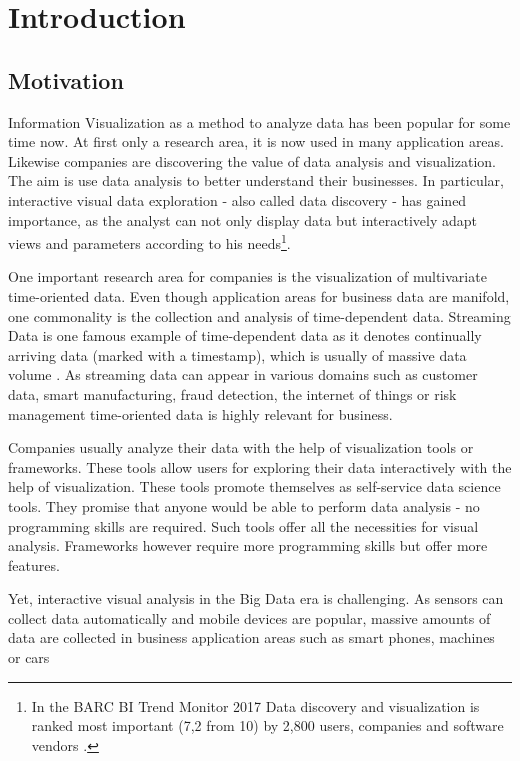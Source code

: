 \chapter{Introduction}
\label{chap:introduction}

\section{Motivation}
Information Visualization as a method to analyze data has been popular for some time now. At first only a research area, it is now used in many application areas. Likewise companies are discovering the value of data analysis and visualization. The aim is use data analysis to better understand their businesses. In particular, interactive visual data exploration - also called data discovery - has gained importance, as the analyst can not only display data but interactively adapt views and parameters according to his needs\footnote{In the BARC BI Trend Monitor 2017 Data discovery and visualization is ranked most important (7,2 from 10) by 2,800 users, companies and software vendors \cite{Bange2016}.}.
\par
One important research area for companies is the visualization of multivariate time-oriented data. Even though application areas for business data are manifold, one commonality is the collection and analysis of time-dependent data. Streaming Data is one famous example of time-dependent data as it denotes continually arriving data (marked with a timestamp), which is usually of massive data volume  \cite{Callaghan2002}. As streaming data can appear in various domains such as customer data,  smart manufacturing,  fraud detection,  the internet of things or risk management time-oriented data is highly relevant for business. 
\par 
Companies usually analyze their data with the help of visualization tools or frameworks. These tools allow users for exploring their data interactively with the help of visualization. These tools promote themselves as self-service data science tools. They promise that anyone would be able to perform data analysis - no programming skills are required. Such tools offer all the necessities for visual analysis. Frameworks however require more programming skills but offer more features.
\par
Yet, interactive visual analysis in the Big Data era is challenging. As sensors can collect data automatically and mobile devices are popular, massive amounts of data are collected in business application areas such as smart phones, machines or cars
